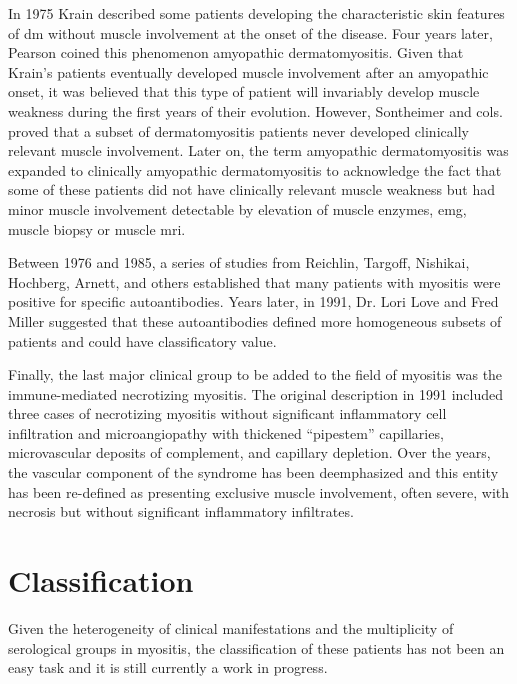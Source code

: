In 1975 Krain\cite{Krain1975} described some patients developing the characteristic skin features of \gls{dm} without muscle involvement at the onset of the disease. Four years later, Pearson coined this phenomenon amyopathic dermatomyositis.\cite{Pearson1979} Given that Krain’s patients eventually developed muscle involvement after an amyopathic onset, it was believed that this type of patient will invariably develop muscle weakness during the first years of their evolution. However, Sontheimer and cols. proved that a subset of dermatomyositis patients never developed clinically relevant muscle involvement.\cite{Euwer1991} Later on, the term amyopathic dermatomyositis was expanded to clinically amyopathic dermatomyositis to acknowledge the fact that some of these patients did not have clinically relevant muscle weakness but had minor muscle involvement detectable by elevation of muscle enzymes, \gls{emg}, muscle biopsy or muscle \gls{mri}.\cite{Sontheimer2002}

Between 1976 and 1985, a series of studies from Reichlin, Targoff, Nishikai, Hochberg, Arnett, and others established that many patients with myositis were positive for specific autoantibodies.\cite{Nishikai1980,Targoff1985,Reichlin1976,Hochberg1984} Years later, in 1991, Dr. Lori Love and Fred Miller suggested that these autoantibodies defined more homogeneous subsets of patients and could have classificatory value.\cite{Love1991}

Finally, the last major clinical group to be added to the field of myositis was the immune-mediated necrotizing myositis. The original description in 1991\cite{EmslieSmith1991} included three cases of necrotizing myositis without significant inflammatory cell infiltration and microangiopathy with thickened “pipestem” capillaries, microvascular deposits of complement, and capillary depletion. Over the years, the vascular component of the syndrome has been deemphasized and this entity has been re-defined as presenting exclusive muscle involvement, often severe, with necrosis but without significant inflammatory infiltrates.

\section{Classification}

Given the heterogeneity of clinical manifestations and the multiplicity of serological groups in myositis, the classification of these patients has not been an easy task and it is still currently a work in progress.


